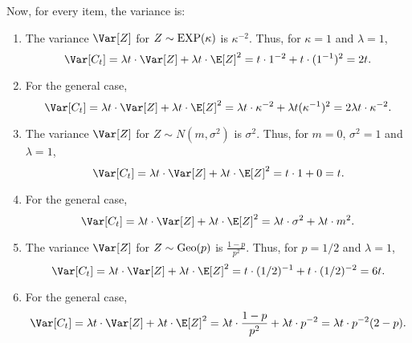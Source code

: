 Now, for every item, the variance is:
\begin{enumerate}[label=(\alph*)]
    \item The variance $\Var[Z]$ for $Z \sim \hbox{EXP}(\kappa)$ is $\kappa^{-2}$. Thus, for $\kappa = 1$ and $\lambda = 1$,
    \[ \Var[C_t] = \lambda t \cdot \Var[Z] + \lambda t  \cdot  \E[Z]^2 = t\cdot 1^{-2} + t\cdot (1^{-1})^2 = 2t. \]

    \item For the general case,
    \[ \Var[C_t] = \lambda t \cdot \Var[Z] + \lambda t  \cdot  \E[Z]^2 = \lambda t \cdot \kappa^{-2} + \lambda t (\kappa^{-1})^2 = 2\lambda t\cdot\kappa^{-2}. \]

    \item The variance $\Var[Z]$ for $Z \sim N(m,\sigma^2)$ is $\sigma^2$. Thus, for $m = 0$, $\sigma^2 = 1$ and $\lambda = 1$,
    \[ \Var[C_t] = \lambda t \cdot \Var[Z] + \lambda t  \cdot  \E[Z]^2 = t\cdot 1 + 0 = t. \]

    \item For the general case,
    \[ \Var[C_t] = \lambda t \cdot \Var[Z] + \lambda t  \cdot  \E[Z]^2 = \lambda t\cdot \sigma^2 + \lambda t\cdot m^2. \]

    \item The variance $\Var[Z]$ for $Z \sim \hbox{Geo}(p)$ is $\frac{1-p}{p^2}$. Thus, for $p = 1/2$ and $\lambda = 1$,
    \[ \Var[C_t] = \lambda t \cdot \Var[Z] + \lambda t  \cdot  \E[Z]^2 = t\cdot (1/2)^{-1} + t\cdot (1/2)^{-2} = 6 t. \]

    \item For the general case,
    \[ \Var[C_t] = \lambda t \cdot \Var[Z] + \lambda t  \cdot  \E[Z]^2 = \lambda t\cdot \frac{1-p}{p^2} + \lambda t \cdot p^{-2} = \lambda t \cdot p^{-2} (2-p). \]
\end{enumerate}